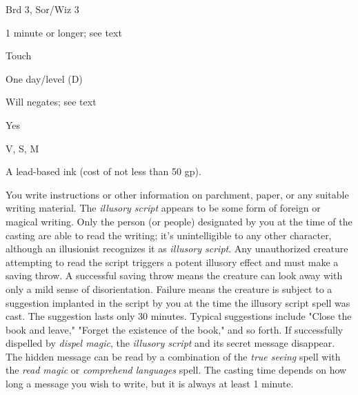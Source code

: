 
\begin{description*}
\item[Level:] Brd 3, Sor/Wiz 3
\item[Casting Time:] 1 minute or longer; see text
\item[Range:] Touch
\item[Duration:] One day/level (D)
\item[Saving Throw:] Will negates; see text
\item[Spell Resistance:] Yes
\item[Components:] V, S, M
\item[Arcane Material Component:] A lead-based ink (cost of not less than 50 gp).
\end{description*}

You write instructions or other information on parchment, paper, or any suitable
writing material. The \textit{illusory script} appears to be some form of foreign
or magical writing. Only the person (or people) designated by you at the time of
the casting are able to read the writing; it's unintelligible to any other character,
although an illusionist recognizes it as \textit{illusory script}.
Any unauthorized creature attempting to read the script triggers a potent illusory
effect and must make a saving throw. A successful saving throw means the creature
can look away with only a mild sense of disorientation. Failure means the creature
is subject to a suggestion implanted in the script by you at the time the illusory
script spell was cast. The suggestion lasts only 30 minutes. Typical suggestions
include "Close the book and leave," "Forget the existence of the book," and
so forth. If successfully dispelled by \textit{dispel magic}, the \textit{illusory
script} and its secret message disappear. The hidden message can be read by a combination
of the \textit{true seeing} spell with the \textit{read magic} or \textit{comprehend
languages} spell.
The casting time depends on how long a message you wish to write, but it is always
at least 1 minute.